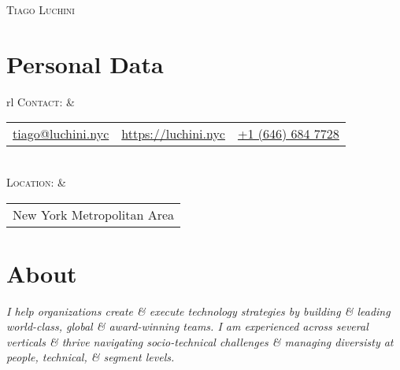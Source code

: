 \documentclass[a4paper,10pt]{article}
\begin{document}
\pagestyle{empty} %

\par{\centering
  {\Huge \textsc{Tiago Luchini}}\bigskip\par}

\section{Personal Data}

\begin{tabular}{rl}
  \textsc{Contact:} & \begin{tabular}{lll}
    \href{mailto:tiago@luchini.nyc}{tiago@luchini.nyc} &
    \href{https://luchini.nyc}{https://luchini.nyc} &
    \href{tel:+16466847728}{+1 (646) 684 7728}
  \end{tabular}\\

  \textsc{Location:} & \begin{tabular}{l}
    New York Metropolitan Area
  \end{tabular}
\end{tabular}

\section{About}
\emph{I help organizations create \& execute technology strategies by
building \& leading world-class, global \& award-winning teams. I am
experienced across several verticals \& thrive navigating
socio-technical challenges \& managing diversisty at people,
technical, \& segment levels.}

\end{document}

